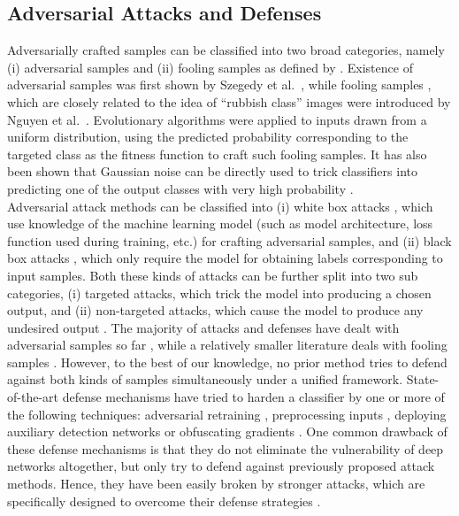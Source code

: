 \documentclass[letterpaper]{article} %
\begin{document}
\subsection{Adversarial Attacks and Defenses}
Adversarially crafted samples can be classified into two broad categories, namely (i) adversarial samples  and (ii) fooling samples as defined by . Existence of adversarial samples was first shown by Szegedy et al.~, while fooling samples , which are closely related to the idea of ``rubbish class'' images  were introduced by Nguyen et al.~. Evolutionary algorithms were applied to inputs drawn from a uniform distribution, using the predicted probability corresponding to the targeted class as the fitness function  to craft such fooling samples. It has also been shown that Gaussian noise can be directly used to trick classifiers into predicting one of the output classes with very high probability .\\
\indent Adversarial attack methods can be classified into (i) white box attacks , which use knowledge of the machine learning model (such as model architecture, loss function used during training, etc.) for crafting adversarial samples, and (ii) black box attacks , which only require the model for obtaining labels corresponding to input samples. Both these kinds of attacks can be further split into two sub categories, (i) targeted attacks, which trick the model into producing a chosen output, and (ii) non-targeted attacks, which cause the model to produce any undesired output . The majority of attacks and defenses have dealt with adversarial samples so far , while a relatively smaller literature deals with fooling samples . However, to the best of our knowledge, no prior method tries to defend against both kinds of samples simultaneously under a unified framework. State-of-the-art defense mechanisms have tried to harden a classifier by one or more of the following techniques: adversarial retraining , preprocessing inputs , deploying auxiliary detection networks  or obfuscating gradients . One common drawback of these defense mechanisms is that they do not eliminate the vulnerability of deep networks altogether, but only try to defend against previously proposed attack methods. Hence, they have been easily broken by stronger attacks, which are specifically designed to overcome their defense strategies .
\end{document}
